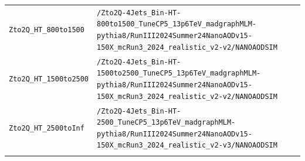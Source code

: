 \begin{longtable}{@{}>{\RaggedRight\arraybackslash}p{} >{\RaggedRight\arraybackslash}p{}@{}}
\addlinespace[2pt]
\texttt{Zto2Q\_\allowbreak{}HT\_\allowbreak{}800to1500} & \texttt{/\allowbreak{}Zto2Q-\allowbreak{}4Jets\_\allowbreak{}Bin-\allowbreak{}HT-\allowbreak{}800to1500\_\allowbreak{}TuneCP5\_\allowbreak{}13p6TeV\_\allowbreak{}madgraphMLM-\allowbreak{}pythia8/\allowbreak{}RunIII2024Summer24NanoAODv15-\allowbreak{}150X\_\allowbreak{}mcRun3\_\allowbreak{}2024\_\allowbreak{}realistic\_\allowbreak{}v2-\allowbreak{}v2/\allowbreak{}NANOAODSIM} \\
\addlinespace[2pt]
\texttt{Zto2Q\_\allowbreak{}HT\_\allowbreak{}1500to2500} & \texttt{/\allowbreak{}Zto2Q-\allowbreak{}4Jets\_\allowbreak{}Bin-\allowbreak{}HT-\allowbreak{}1500to2500\_\allowbreak{}TuneCP5\_\allowbreak{}13p6TeV\_\allowbreak{}madgraphMLM-\allowbreak{}pythia8/\allowbreak{}RunIII2024Summer24NanoAODv15-\allowbreak{}150X\_\allowbreak{}mcRun3\_\allowbreak{}2024\_\allowbreak{}realistic\_\allowbreak{}v2-\allowbreak{}v2/\allowbreak{}NANOAODSIM} \\
\addlinespace[2pt]
\texttt{Zto2Q\_\allowbreak{}HT\_\allowbreak{}2500toInf} & \texttt{/\allowbreak{}Zto2Q-\allowbreak{}4Jets\_\allowbreak{}Bin-\allowbreak{}HT-\allowbreak{}2500\_\allowbreak{}TuneCP5\_\allowbreak{}13p6TeV\_\allowbreak{}madgraphMLM-\allowbreak{}pythia8/\allowbreak{}RunIII2024Summer24NanoAODv15-\allowbreak{}150X\_\allowbreak{}mcRun3\_\allowbreak{}2024\_\allowbreak{}realistic\_\allowbreak{}v2-\allowbreak{}v3/\allowbreak{}NANOAODSIM} \\
\addlinespace[2pt]
\end{longtable}
